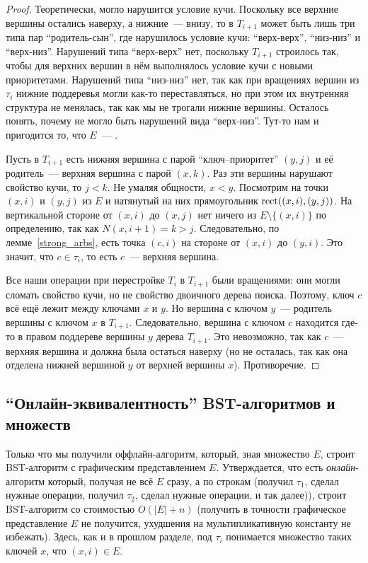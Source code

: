 \begin{proof}
Теоретически, могло нарушится условие кучи. Поскольку все верхние вершины остались наверху, а нижние~--- внизу, то в $T_{i+1}$ может быть лишь три типа пар ``родитель-сын'', где нарушилось условие кучи: ``верх-верх'', ``низ-низ'' и ``верх-низ''. Нарушений типа ``верх-верх''
нет, поскольку $T_{i+1}$ строилось так, чтобы для верхних вершин в нём выполнялось условие кучи с новыми приоритетами. Нарушений типа ``низ-низ'' нет, так как при вращениях вершин из $\tau_i$ нижние поддеревья могли как-то переставляться, но при этом их внутренняя структура не менялась, так как мы не трогали нижние вершины. Осталось понять, почему не могло быть нарушений вида ``верх-низ''. Тут-то нам и пригодится то, что $E$~--- \arbs.

Пусть в $T_{i+1}$ есть нижняя вершина с парой ``ключ--приоритет'' $(y, j)$ и её родитель~--- верхняя вершина с парой $(x, k)$. Раз эти вершины нарушают свойство кучи, то $j < k$.
Не умаляя общности, $x < y$. Посмотрим на точки $(x, i)$ и $(y, j)$ из $E$ и натянутый на них прямоугольник $\operatorname{rect}((x, i), (y, j))$. На вертикальной стороне от $(x, i)$ до $(x, j)$ нет ничего из $E \setminus \{(x, i) \}$ по определению, так как $N(x, i + 1) = k > j$. Следовательно, по лемме~\ref{strong_arbs}, есть точка $(c, i)$ на
стороне от $(x, i)$ до $(y, i)$. Это значит, что $c \in \tau_i$, то есть $c$~--- верхняя вершина.

Все наши операции при перестройке $T_i$ в $T_{i+1}$ были вращениями: они могли сломать свойство кучи, но не свойство двоичного дерева поиска. Поэтому, ключ $c$ всё ещё лежит между ключами $x$ и $y$. Но вершина с ключом $y$~--- родитель вершины с ключом $x$ в $T_{i+1}$. Следовательно, вершина с ключом $c$ находится где-то в правом поддереве вершины $y$ дерева $T_{i + 1}$. Это невозможно, так как $c$~--- верхняя вершина и должна была остаться наверху (но не осталась, так как она отделена нижней вершиной $y$ от верхней вершины $x$). Противоречие.
\end{proof}

\subsection{``Онлайн-эквивалентность'' BST-алгоритмов и \arbs множеств}

Только что мы получили оффлайн-алгоритм, который, зная \arbs множество $E$, строит BST-алгоритм с графическим представлением $E$. Утверждается, что есть \emph{онлайн}-алгоритм который, получая не всё $E$ сразу, а по строкам (получил $\tau_1$, сделал нужные операции, получил $\tau_2$, сделал нужные операции, и так далее)), строит BST-алгоритм со стоимостью $O(|E| + n)$ 	
(получить в точности графическое представление $E$ не получится, ухудшения на мультипликативную константу не избежать). Здесь, как и в прошлом разделе, под $\tau_i$
понимается множество таких ключей $x$, что $(x, i) \in E$.

